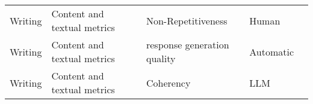 \begin{small}
\begin{center}
\begin{longtable}{@{}p{}p{}p{}p{}p{}@{}}
Writing                  & Content and textual metrics         & Non-Repetitiveness                                                                                                                                                                                          & Human     & \cite{mishra-etal-2023-e}                                                                                                                                                                                                                                                                                                                                                                                        \\
Writing                  & Content and textual metrics         & response generation quality                                                                                                                                                                                 & Automatic & \cite{li2024hello}                                                                                                                                                                                                                                                                                                                                                                                                         \\
Writing                  & Content and textual metrics         & Coherency                                                                                                                                                                                                   & LLM       &  \cite{10.1145/3649921.3656987}    



\end{longtable}
\end{center}
\end{small}

\clearpage
\twocolumn